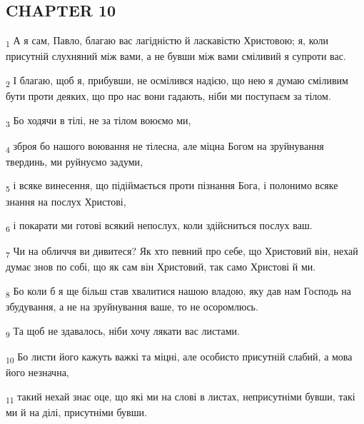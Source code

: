\subsection{CHAPTER 10}
\begin{tcolorbox}
\textsubscript{1} А я сам, Павло, благаю вас лагідністю й ласкавістю Христовою; я, коли присутній слухняний між вами, а не бувши між вами сміливий я супроти вас.
\end{tcolorbox}
\begin{tcolorbox}
\textsubscript{2} І благаю, щоб я, прибувши, не осмілився надією, що нею я думаю сміливим бути проти деяких, що про нас вони гадають, ніби ми поступаєм за тілом.
\end{tcolorbox}
\begin{tcolorbox}
\textsubscript{3} Бо ходячи в тілі, не за тілом воюємо ми,
\end{tcolorbox}
\begin{tcolorbox}
\textsubscript{4} зброя бо нашого воювання не тілесна, але міцна Богом на зруйнування твердинь, ми руйнуємо задуми,
\end{tcolorbox}
\begin{tcolorbox}
\textsubscript{5} і всяке винесення, що підіймається проти пізнання Бога, і полонимо всяке знання на послух Христові,
\end{tcolorbox}
\begin{tcolorbox}
\textsubscript{6} і покарати ми готові всякий непослух, коли здійсниться послух ваш.
\end{tcolorbox}
\begin{tcolorbox}
\textsubscript{7} Чи на обличчя ви дивитеся? Як хто певний про себе, що Христовий він, нехай думає знов по собі, що як сам він Христовий, так само Христові й ми.
\end{tcolorbox}
\begin{tcolorbox}
\textsubscript{8} Бо коли б я ще більш став хвалитися нашою владою, яку дав нам Господь на збудування, а не на зруйнування ваше, то не осоромлюсь.
\end{tcolorbox}
\begin{tcolorbox}
\textsubscript{9} Та щоб не здавалось, ніби хочу лякати вас листами.
\end{tcolorbox}
\begin{tcolorbox}
\textsubscript{10} Бо листи його кажуть важкі та міцні, але особисто присутній слабий, а мова його незначна,
\end{tcolorbox}
\begin{tcolorbox}
\textsubscript{11} такий нехай знає оце, що які ми на слові в листах, неприсутніми бувши, такі ми й на ділі, присутніми бувши.
\end{tcolorbox}
